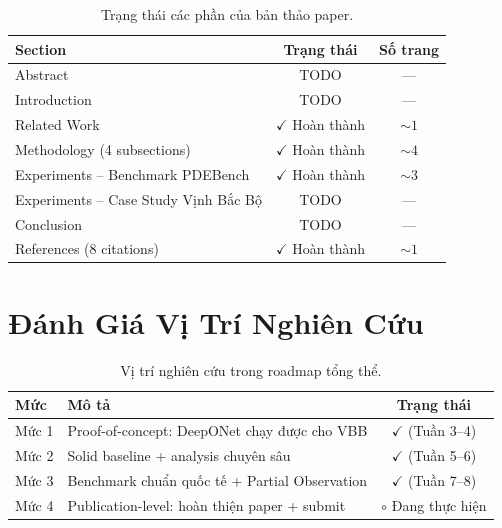 \documentclass[12pt,a4paper]{article}
\begin{document}
\begin{table}[ht]
  \centering
  \caption{Trạng thái các phần của bản thảo paper.}
  \label{tab:paper_status}
  \begin{tabular}{@{}lcc@{}}
    \toprule
    \textbf{Section} & \textbf{Trạng thái} & \textbf{Số trang} \\
    \midrule
    Abstract & TODO & --- \\
    Introduction & TODO & --- \\
    Related Work & $\checkmark$ Hoàn thành & $\sim 1$ \\
    Methodology (4 subsections) & $\checkmark$ Hoàn thành & $\sim 4$ \\
    Experiments -- Benchmark PDEBench & $\checkmark$ Hoàn thành & $\sim 3$ \\
    Experiments -- Case Study Vịnh Bắc Bộ & TODO & --- \\
    Conclusion & TODO & --- \\
    References (8 citations) & $\checkmark$ Hoàn thành & $\sim 1$ \\
    \bottomrule
  \end{tabular}
\end{table}

\section{Đánh Giá Vị Trí Nghiên Cứu}

\begin{table}[ht]
  \centering
  \caption{Vị trí nghiên cứu trong roadmap tổng thể.}
  \label{tab:roadmap}
  \begin{tabular}{@{}llc@{}}
    \toprule
    \textbf{Mức} & \textbf{Mô tả} & \textbf{Trạng thái} \\
    \midrule
    Mức 1 & Proof-of-concept: DeepONet chạy được cho VBB & $\checkmark$ (Tuần 3--4) \\
    Mức 2 & Solid baseline + analysis chuyên sâu & $\checkmark$ (Tuần 5--6) \\
    Mức 3 & Benchmark chuẩn quốc tế + Partial Observation & $\checkmark$ (Tuần 7--8) \\
    Mức 4 & Publication-level: hoàn thiện paper + submit & $\circ$ Đang thực hiện \\
    \bottomrule
  \end{tabular}
\end{table}

\end{document}
